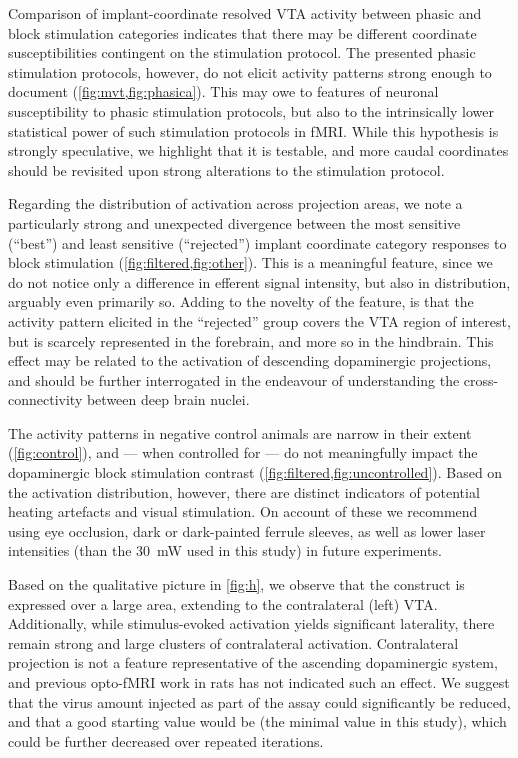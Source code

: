 Comparison of implant-coordinate resolved VTA activity between phasic and block stimulation categories indicates that there may be different coordinate susceptibilities contingent on the stimulation protocol.
The presented phasic stimulation protocols, however, do not elicit activity patterns strong enough to document (\cref{fig:mvt,fig:phasica}).
This may owe to features of neuronal susceptibility to phasic stimulation protocols, but also to the intrinsically lower statistical power of such stimulation protocols in fMRI.
While this hypothesis is strongly speculative, we highlight that it is testable, and more caudal coordinates should be revisited upon strong alterations to the stimulation protocol.

Regarding the distribution of activation across projection areas, we note a particularly strong and unexpected divergence between the most sensitive (“best”) and least sensitive (“rejected”) implant coordinate category responses to block stimulation (\cref{fig:filtered,fig:other}).
This is a meaningful feature, since we do not notice only a difference in efferent signal intensity, but also in distribution, arguably even primarily so.
Adding to the novelty of the feature, is that the activity pattern elicited in the “rejected” group covers the VTA region of interest, but is scarcely represented in the forebrain, and more so in the hindbrain.
This effect may be related to the activation of descending dopaminergic projections, and should be further interrogated in the endeavour of understanding the cross-connectivity between deep brain nuclei.

The activity patterns in negative control animals are narrow in their extent (\cref{fig:control}), and --- when controlled for --- do not meaningfully impact the dopaminergic block stimulation contrast (\cref{fig:filtered,fig:uncontrolled}).
Based on the activation distribution, however, there are distinct indicators of potential heating artefacts and visual stimulation.
On account of these we recommend using eye occlusion, dark or dark-painted ferrule sleeves, as well as lower laser intensities (than the \SI{30}{\milli\watt} used in this study) in future experiments.

Based on the qualitative picture in \cref{fig:h}, we observe that the construct is expressed over a large area, extending to the contralateral (left) VTA.
Additionally, while stimulus-evoked activation yields significant laterality, there remain strong and large clusters of contralateral activation.
Contralateral projection is not a feature representative of the ascending dopaminergic system, and previous opto-fMRI work in rats \cite{Lohani2016} has not indicated such an effect.
We suggest that the virus amount injected as part of the assay could significantly be reduced, and that a good starting value would be
 (the minimal value in this study),
which could be further decreased over repeated iterations.

